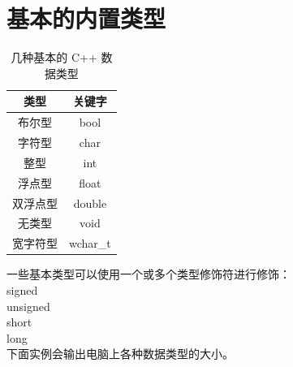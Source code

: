 \documentclass[12pt,twiside,a4paper]{ctexbook}
\numberwithin{chapter}{part}
\begin{document}
\section{基本的内置类型}
\begin{table}[h]
    \centering
    \caption{几种基本的 C++ 数据类型}
    \label{tab:example}
    \begin{tabular}{|c|c|}
    \hline
    \textbf{类型} & \textbf{关键字}\\
    \hline
    布尔型 & bool\\
    \hline
    字符型 & char\\
    \hline
    整型 & int\\
    \hline
    浮点型 & float\\
    \hline
    双浮点型 & double\\
    \hline
    无类型 & void\\
    \hline
    宽字符型 & wchar\_t\\
    \hline
    \end{tabular}
\end{table}
一些基本类型可以使用一个或多个类型修饰符进行修饰：\\
signed\\
unsigned\\
short\\
long\\
下面实例会输出电脑上各种数据类型的大小。\\
\end{document}
